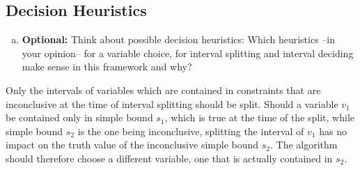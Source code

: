 
\subsection{Decision Heuristics}

\begin{enumerate}[(e)]
    \item \textbf{Optional:} Think about possible decision heuristics: Which heuristics –in your opinion– for a variable choice, for interval splitting and interval deciding make sense in this framework and why?
\end{enumerate}

Only the intervals of variables which are contained in constraints that are inconclusive at the time of interval splitting should be split. Should a variable $v_1$ be contained only in simple bound $s_1$, which is true at the time of the split, while simple bound $s_2$ is the one being inconclusive, splitting the interval of $v_1$ has no impact on the truth value of the inconclusive simple bound $s_2$. The algorithm should therefore choose a different variable, one that is actually contained in $s_2$.
